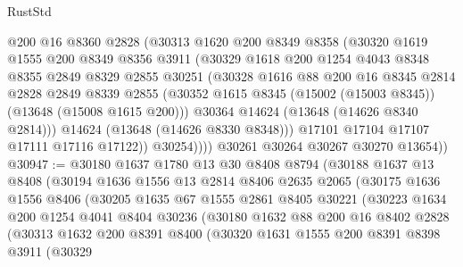 \begin{lexlean}{RustStd}
\begin{coremodule}
                @200
                @16
                @8360
                @2828
                (@30313
                  @1620
                  @200
                  @8349
                  @8358
                  (@30320
                    @1619
                    @1555
                    @200
                    @8349
                    @8356
                    @3911
                    (@30329
                      @1618
                      @200
                      @1254
                      @4043
                      @8348
                      @8355
                      @2849
                      @8329
                      @2855
                      @30251
                      (@30328
                        @1616
                        @88
                        @200
                        @16
                        @8345
                        @2814
                        @2828
                        @2849
                        @8339
                        @2855
                        (@30352 @1615 @8345 (@15002 (@15003 @8345)) (@13648 (@15008 @1615 @200)))
                        @30364
                        @14624
                        (@13648 (@14626 @8340 @2814)))
                      @14624
                      (@13648 (@14626 @8330 @8348)))
                    @17101
                    @17104
                    @17107
                    @17111
                    @17116
                    @17122))
                @30254))))
        @30261
        @30264
        @30267
        @30270
        @13654))
@30947 := @30180
    @1637
    @1780
    @13
    @30
    @8408
    @8794
    (@30188
      @1637
      @13
      @8408
      (@30194
        @1636
        @1556
        @13
        @2814
        @8406
        @2635
        @2065
        (@30175
          @1636
          @1556
          @8406
          (@30205
            @1635
            @67
            @1555
            @2861
            @8405
            @30221
            (@30223
              @1634
              @200
              @1254
              @4041
              @8404
              @30236
              (@30180
                @1632
                @88
                @200
                @16
                @8402
                @2828
                (@30313
                  @1632
                  @200
                  @8391
                  @8400
                  (@30320
                    @1631
                    @1555
                    @200
                    @8391
                    @8398
                    @3911
                    (@30329

\end{coremodule}
\end{lexlean}
